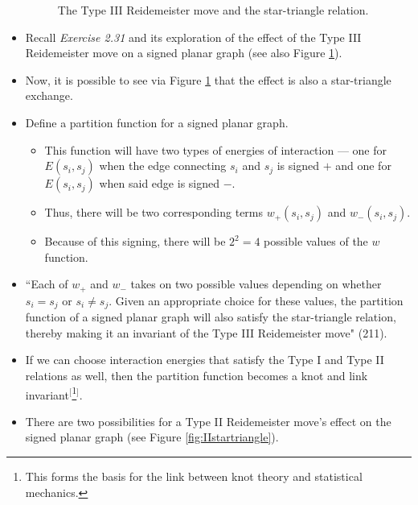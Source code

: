 \documentclass[titlepage]{article}
\numberwithin{figure}{section}
\numberwithin{table}{section}
\numberwithin{equation}{section}
\newcommand{\dq}[2]{``#1" (#2).}
\begin{document}
\begin{itemize}
\begin{figure}[h!]
        \caption{The Type III Reidemeister move and the star-triangle relation.}
        \label{fig:IIIstartriangle}
    \end{figure}
    \item Recall \emph{Exercise 2.31} and its exploration of the effect of the Type III Reidemeister move on a signed planar graph (see also Figure \ref{fig:IIIstartriangle}).
    \item Now, it is possible to see via Figure \ref{fig:IIIstartriangle} that the effect is also a star-triangle exchange.
    \item Define a partition function for a signed planar graph.
    \begin{itemize}
        \item This function will have two types of energies of interaction --- one for $E(s_i,s_j)$ when the edge connecting $s_i$ and $s_j$ is signed $+$ and one for $E(s_i,s_j)$ when said edge is signed $-$.
        \item Thus, there will be two corresponding terms $w_+(s_i,s_j)$ and $w_-(s_i,s_j)$.
        \item Because of this signing, there will be $2^2=4$ possible values of the $w$ function.
    \end{itemize}
    \item \dq{Each of $w_+$ and $w_-$ takes on two possible values depending on whether $s_i=s_j$ or $s_i\neq s_j$. Given an appropriate choice for these values, the partition function of a signed planar graph will also satisfy the star-triangle relation, thereby making it an invariant of the Type III Reidemeister move}{211}
    \item If we can choose interaction energies that satisfy the Type I and Type II relations as well, then the partition function becomes a knot and link invariant$^[$\footnote{This forms the basis for the link between knot theory and statistical mechanics.}$^]$.
    \item There are two possibilities for a Type II Reidemeister move's effect on the signed planar graph (see Figure \ref{fig:IIstartriangle}).

\end{itemize}
\end{document}
